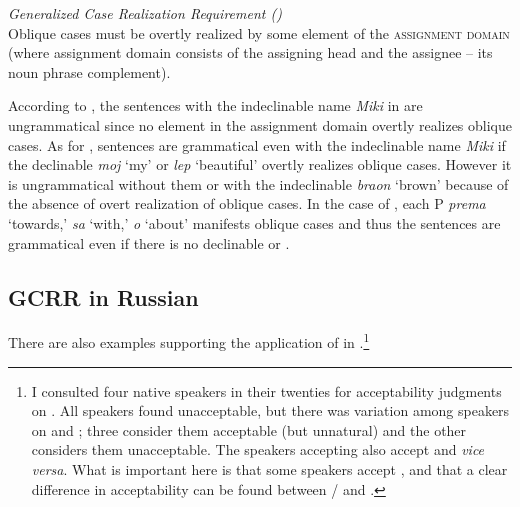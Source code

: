 \documentclass[output=paper,colorlinks,citecolor=brown,newtxmath]{langsci/langscibook}
\begin{document}
\begin{exe}\ex \textit{Generalized Case Realization Requirement ()} \label{GCRR}\\
Oblique cases must be overtly realized by some element of the
\textsc{assignment domain} (where assignment domain consists of the assigning head and the assignee -- its noun phrase complement).
\hfill\citep[125]{Horvath2014}
\end{exe}

\noindent
According to , the sentences with the indeclinable name \textit{Miki} in  are ungrammatical since no element in the assignment domain overtly realizes oblique cases.
As for , sentences are grammatical even with the indeclinable name \textit{Miki} if the declinable  \textit{moj} `my' or  \textit{lep} `beautiful' overtly realizes oblique cases.
However it is ungrammatical without them or with the indeclinable  \textit{braon} `brown' because of the absence of overt realization of oblique cases.
In the case of , each P \textit{prema} `towards,' \textit{sa} `with,' \textit{o} `about' manifests oblique cases and thus
 the sentences are grammatical even if there is no declinable  or .


\subsection{GCRR in Russian}

There are also examples supporting the application of  in .\footnote{
            I consulted four  native speakers in their twenties for acceptability judgments on . All speakers found  unacceptable, but there was variation among speakers on  and ; three consider them acceptable (but unnatural) and the other considers them unacceptable. The speakers accepting  also accept  and \textit{vice versa}. What is important here is that some speakers accept ,  and that a clear difference in acceptability can be found between  / and .
            }
\end{document}
